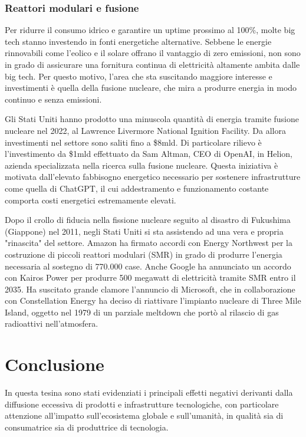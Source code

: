 \documentclass[12pt,a4paper,oneside]{book}
\begin{document}
\subsection{Reattori modulari e fusione}
Per ridurre il consumo idrico e garantire un uptime prossimo al 100\%, molte big tech stanno investendo in fonti energetiche alternative. Sebbene le energie rinnovabili come l'eolico e il solare offrano il vantaggio di zero emissioni, non sono in grado di assicurare una fornitura continua di elettricità altamente ambita dalle big tech. Per questo motivo, l'area che sta suscitando maggiore interesse e investimenti è quella della fusione nucleare, che mira a produrre energia in modo continuo e senza emissioni.

Gli Stati Uniti hanno prodotto una minuscola quantità di energia tramite fusione nucleare nel 2022, al Lawrence Livermore National Ignition Facility. Da allora investimenti nel settore sono saliti fino a \$8mld. Di particolare rilievo è l'investimento da \$1mld effettuato da Sam Altman, CEO di OpenAI, in Helion, azienda specializzata nella ricerca sulla fusione nucleare. Questa iniziativa è motivata dall'elevato fabbisogno energetico necessario per sostenere infrastrutture come quella di ChatGPT, il cui addestramento e funzionamento costante comporta costi energetici estremamente elevati.

Dopo il crollo di fiducia nella fissione nucleare seguito al disastro di Fukushima (Giappone) nel 2011, negli Stati Uniti si sta assistendo ad una vera e propria "rinascita" del settore. Amazon ha firmato accordi con Energy Northwest per la costruzione di piccoli reattori modulari (SMR) in grado di produrre l'energia necessaria al sostegno di 770.000 case. Anche Google ha annunciato un accordo con Kairos Power per produrre 500 megawatt di elettricità tramite SMR entro il 2035.
Ha suscitato grande clamore l'annuncio di Microsoft, che in collaborazione con Constellation Energy ha deciso di riattivare l'impianto nucleare di Three Mile Island, oggetto nel 1979 di un parziale meltdown che portò al rilascio di gas radioattivi nell'atmosfera.

\chapter{Conclusione}

In questa tesina sono stati evidenziati i principali effetti negativi derivanti dalla diffusione eccessiva di prodotti e infrastrutture tecnologiche, con particolare attenzione all'impatto sull'ecosistema globale e sull'umanità, in qualità sia di consumatrice sia di produttrice di tecnologia.
\end{document}
